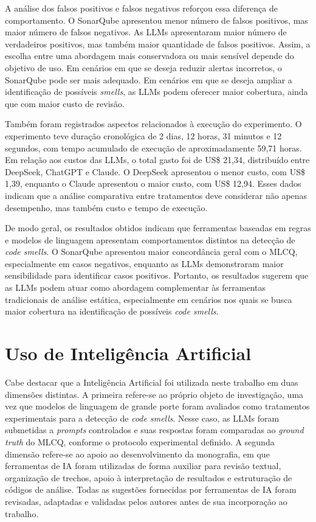 A análise dos falsos positivos e falsos negativos reforçou essa diferença de comportamento. O SonarQube apresentou menor 
número de falsos positivos, mas maior número de falsos negativos. As LLMs apresentaram maior número de verdadeiros positivos, 
mas também maior quantidade de falsos positivos. Assim, a escolha entre uma abordagem mais conservadora ou mais sensível 
depende do objetivo de uso. Em cenários em que se deseja reduzir alertas incorretos, o SonarQube pode ser mais adequado. 
Em cenários em que se deseja ampliar a identificação de possíveis \textit{smells}, as LLMs podem oferecer maior cobertura, 
ainda que com maior custo de revisão.

Também foram registrados aspectos relacionados à execução do experimento. O experimento teve duração cronológica de 2 dias, 
12 horas, 31 minutos e 12 segundos, com tempo acumulado de execução de aproximadamente 59,71 horas. Em relação aos custos das LLMs, 
o total gasto foi de US\$ 21,34, distribuído entre DeepSeek, ChatGPT e Claude. O DeepSeek apresentou o menor custo, com US\$ 1,39, 
enquanto o Claude apresentou o maior custo, com US\$ 12,94. Esses dados indicam que a análise comparativa entre tratamentos deve 
considerar não apenas desempenho, mas também custo e tempo de execução.

De modo geral, os resultados obtidos indicam que ferramentas baseadas em regras e modelos de linguagem apresentam comportamentos 
distintos na detecção de \textit{code smells}. O SonarQube apresentou maior concordância geral com o MLCQ, especialmente em casos 
negativos, enquanto as LLMs demonstraram maior sensibilidade para identificar casos positivos. Portanto, os resultados sugerem 
que as LLMs podem atuar como abordagem complementar às ferramentas tradicionais de análise estática, especialmente em cenários 
nos quais se busca maior cobertura na identificação de possíveis \textit{code smells}.

\section{Uso de Inteligência Artificial}

Cabe destacar que a Inteligência Artificial foi utilizada neste trabalho em duas dimensões distintas. A primeira refere-se ao próprio objeto de investigação, uma vez que modelos de linguagem de grande porte foram avaliados como tratamentos experimentais para a detecção de \textit{code smells}. Nesse caso, as LLMs foram submetidas a \textit{prompts} controlados e suas respostas foram comparadas ao \textit{ground truth} do MLCQ, conforme o protocolo experimental definido. A segunda dimensão refere-se ao apoio ao desenvolvimento da monografia, em que ferramentas de IA foram utilizadas de forma auxiliar para revisão textual, organização de trechos, apoio à interpretação de resultados e estruturação de códigos de análise. Todas as sugestões fornecidas por ferramentas de IA foram revisadas, adaptadas e validadas pelos autores antes de sua incorporação ao trabalho.

